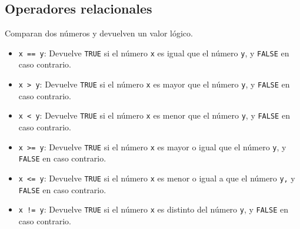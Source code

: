 \documentclass[
  a4paper,
]{scrreport}
\providecommand{\tightlist}{%
  \setlength{\itemsep}{0pt}\setlength{\parskip}{0pt}}\usepackage{longtable,booktabs,array}
\theoremstyle{definition}
\theoremstyle{definition}
\theoremstyle{remark}
\begin{document}
\subsection{Operadores relacionales}\label{operadores-relacionales}

Comparan dos números y devuelven un valor lógico.

\begin{itemize}
\tightlist
\item
  \texttt{x\ ==\ y}: Devuelve \texttt{TRUE} si el número \texttt{x} es
  igual que el número \texttt{y}, y \texttt{FALSE} en caso contrario.
\item
  \texttt{x\ \textgreater{}\ y}: Devuelve \texttt{TRUE} si el número
  \texttt{x} es mayor que el número \texttt{y}, y \texttt{FALSE} en caso
  contrario.
\item
  \texttt{x\ \textless{}\ y}: Devuelve \texttt{TRUE} si el número
  \texttt{x} es menor que el número \texttt{y}, y \texttt{FALSE} en caso
  contrario.
\item
  \texttt{x\ \textgreater{}=\ y}: Devuelve \texttt{TRUE} si el número
  \texttt{x} es mayor o igual que el número \texttt{y}, y \texttt{FALSE}
  en caso contrario.
\item
  \texttt{x\ \textless{}=\ y}: Devuelve \texttt{TRUE} si el número
  \texttt{x} es menor o igual a que el número \texttt{y,} y
  \texttt{FALSE} en caso contrario.
\item
  \texttt{x\ !=\ y}: Devuelve \texttt{TRUE} si el número \texttt{x} es
  distinto del número \texttt{y}, y \texttt{FALSE} en caso contrario.
\end{itemize}
\end{document}
